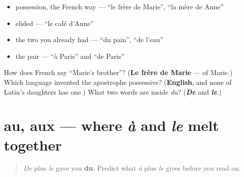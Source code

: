 \begin{itemize}
\raggedright
  \item possession, the French way — \textquotedblleft{}le frère de Marie\textquotedblright{}, \textquotedblleft{}la mère de Anne\textquotedblright{}
  \item elided — \textquotedblleft{}le café d'Anne\textquotedblright{}
  \item the two you already had — \textquotedblleft{}du pain\textquotedblright{}, \textquotedblleft{}de l'eau\textquotedblright{}
  \item the pair — \textquotedblleft{}à Paris\textquotedblright{} and \textquotedblleft{}de Paris\textquotedblright{}
\end{itemize}

\begin{tcolorbox}[breakable,colback=teal!4,colframe=teal!35!black,title={Before you move on}]
How does French say \textquotedblleft{}Marie's brother\textquotedblright{}? (\textbf{Le frère de Marie} — of Marie.) Which language invented the apostrophe possessive? (\textbf{English}, and none of Latin's daughters has one.) What two words are inside \emph{du}? (\emph{\textbf{De}} and \emph{\textbf{le}}.)
\end{tcolorbox}
\section[au, aux]{au, aux — where \emph{à} and \emph{le} melt together}

\label{lesson:FR-C35-au-aux}



\begin{quote}
\emph{De} plus \emph{le} gave you \textbf{du}. Predict what \emph{à} plus \emph{le} gives before you read on.
\end{quote}

